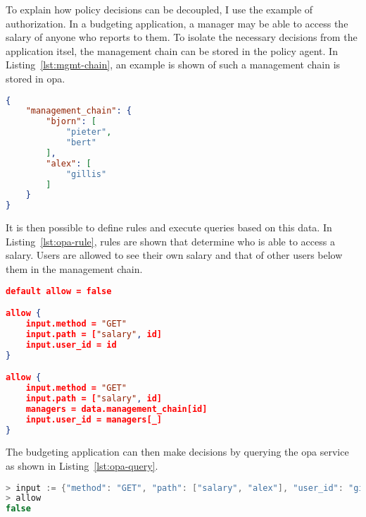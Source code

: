 To explain how policy decisions can be decoupled, I use the example of authorization.
In a budgeting application, a manager may be able to access the salary of anyone who reports to them.
To isolate the necessary decisions from the application itsel, the management chain can be stored in the policy agent.
In Listing~\ref{lst:mgmt-chain}, an example is shown of such a management chain is stored in \gls{opa}.

\begin{lstlisting}[language={json},caption={Management chain data example for use in OPA.},label={lst:mgmt-chain},xleftmargin=15pt]
{
    "management_chain": {
        "bjorn": [
            "pieter",
            "bert"
        ],
        "alex": [
            "gillis"
        ]
    }
}
\end{lstlisting}

It is then possible to define rules and execute queries based on this data.
In Listing~\ref{lst:opa-rule}, rules are shown that determine who is able to access a salary.
Users are allowed to see their own salary and that of other users below them in the management chain.

\begin{minipage}[t]{0.9\linewidth}
\begin{lstlisting}[language={json},caption={OPA rules that define who has access to the salary of other users.},label={lst:opa-rule},xleftmargin=15pt]
default allow = false

allow {
    input.method = "GET"
    input.path = ["salary", id]
    input.user_id = id
}

allow {
    input.method = "GET"
    input.path = ["salary", id]
    managers = data.management_chain[id]
    input.user_id = managers[_]
}
\end{lstlisting}
\end{minipage}

The budgeting application can then make decisions by querying the \gls{opa} service as shown in Listing~\ref{lst:opa-query}.

\begin{minipage}[t]{0.9\linewidth}
\begin{lstlisting}[language={java},caption={Management chain data example for use in OPA.},label={lst:opa-query},xleftmargin=15pt]
> input := {"method": "GET", "path": ["salary", "alex"], "user_id": "gillis"}
> allow
false
\end{lstlisting}
\end{minipage}

